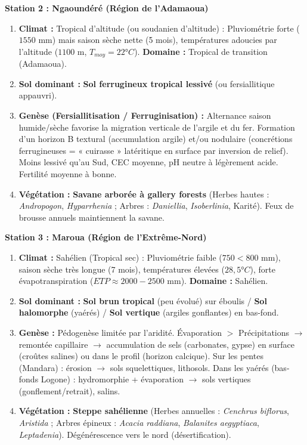 \documentclass[11pt]{article}
\begin{document}
\begin{exoresolu}
\textbf{Station 2 : Ngaoundéré (Région de l'Adamaoua)}
\begin{enumerate}
    \item \textbf{Climat :} Tropical d'altitude (ou soudanien d'altitude) : Pluviométrie forte ($1550$ mm) mais saison sèche nette (5 mois), températures adoucies par l'altitude ($1100$ m, $T_{moy}=22°C$). \textbf{Domaine :} Tropical de transition (Adamaoua).
    \item \textbf{Sol dominant :} \textbf{Sol ferrugineux tropical lessivé} (ou fersiallitique appauvri).
    \item \textbf{Genèse (Fersiallitisation / Ferruginisation) :} Alternance saison humide/sèche favorise la migration verticale de l'argile et du fer. Formation d'un horizon B textural (accumulation argile) et/ou nodulaire (concrétions ferrugineuses = « cuirasse » latéritique en surface par inversion de relief). Moins lessivé qu'au Sud, CEC moyenne, pH neutre à légèrement acide. Fertilité moyenne à bonne.
    \item \textbf{Végétation :} \textbf{Savane arborée à gallery forests} (Herbes hautes : \emph{Andropogon}, \emph{Hyparrhenia} ; Arbres : \emph{Daniellia}, \emph{Isoberlinia}, Karité). Feux de brousse annuels maintiennent la savane.
\end{enumerate}

\textbf{Station 3 : Maroua (Région de l'Extrême-Nord)}
\begin{enumerate}
    \item \textbf{Climat :} Sahélien (Tropical sec) : Pluviométrie faible ($750 < 800$ mm), saison sèche très longue (7 mois), températures élevées ($28,5°C$), forte évapotranspiration ($ETP \approx 2000-2500$ mm). \textbf{Domaine :} Sahélien.
    \item \textbf{Sol dominant :} \textbf{Sol brun tropical} (peu évolué) sur éboulis / \textbf{Sol halomorphe} (yaérés) / \textbf{Sol vertique} (argiles gonflantes) en bas-fond.
    \item \textbf{Genèse :} Pédogenèse limitée par l'aridité. Évaporation $>$ Précipitations $\rightarrow$ remontée capillaire $\rightarrow$ accumulation de sels (carbonates, gypse) en surface (croûtes salines) ou dans le profil (horizon calcique). Sur les pentes (Mandara) : érosion $\rightarrow$ sols squelettiques, lithosols. Dans les yaérés (bas-fonds Logone) : hydromorphie + évaporation $\rightarrow$ sols vertiques (gonflement/retrait), salins.
    \item \textbf{Végétation :} \textbf{Steppe sahélienne} (Herbes annuelles : \emph{Cenchrus biflorus}, \emph{Aristida} ; Arbres épineux : \emph{Acacia raddiana}, \emph{Balanites aegyptiaca}, \emph{Leptadenia}). Dégénérescence vers le nord (désertification).
\end{enumerate}


\end{exoresolu}
\end{document}
